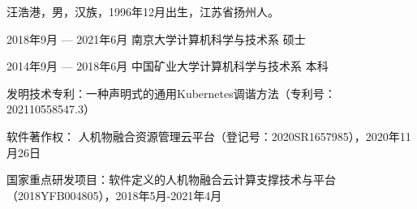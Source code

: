 \documentclass[macfonts,master]{njuthesis}
\begin{document}
\backmatter
\begin{resume}
\begin{authorinfo}
\noindent 汪浩港，男，汉族，1996年12月出生，江苏省扬州人。
\end{authorinfo}
\begin{education}
\item[2018年9月 --- 2021年6月] 南京大学计算机科学与技术系 \hfill 硕士
\item[2014年9月 --- 2018年6月] 中国矿业大学计算机科学与技术系 \hfill 本科
\end{education}
\begin{publications}
\item 发明技术专利：一种声明式的通用Kubernetes调谐方法（专利号：202110558547.3）
\item 软件著作权： 人机物融合资源管理云平台（登记号：2020SR1657985），2020年11月26日
\end{publications}

\begin{projects}
	\item 国家重点研发项目：软件定义的人机物融合云计算支撑技术与平台（2018YFB004805），2018年5月-2021年4月
\end{projects}
\end{resume}

\makelicense

\end{document}
